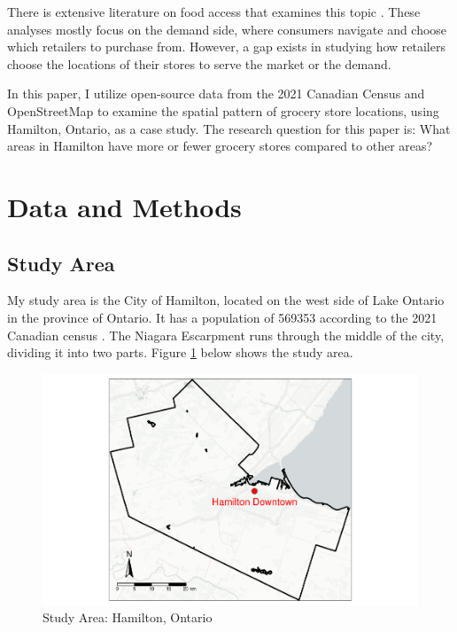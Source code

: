 \documentclass[preprint, 3p,
authoryear]{elsarticle} %
\begin{document}
There is extensive literature on food access that examines this topic
\citep{christian2012using, widener2015spatiotemporal, farber2014temporal, widener2017changes}.
These analyses mostly focus on the demand side, where consumers navigate
and choose which retailers to purchase from. However, a gap exists in
studying how retailers choose the locations of their stores to serve the
market or the demand.

In this paper, I utilize open-source data from the 2021 Canadian Census
\citep{census} and OpenStreetMap \citep{osm} to examine the spatial
pattern of grocery store locations, using Hamilton, Ontario, as a case
study. The research question for this paper is: What areas in Hamilton
have more or fewer grocery stores compared to other areas?

\section{Data and Methods}\label{data-and-methods}

\subsection{Study Area}\label{study-area}

My study area is the City of Hamilton, located on the west side of Lake
Ontario in the province of Ontario. It has a population of 569353
according to the 2021 Canadian census \citep{census}. The Niagara
Escarpment runs through the middle of the city, dividing it into two
parts. Figure \ref{fig:study_area} below shows the study area.

\begin{figure}
\centering
\includegraphics{grocery_store_hamilton_files/figure-latex/unnamed-chunk-4-1.pdf}
\caption{\label{fig:study_area}Study Area: Hamilton, Ontario}
\end{figure}
\end{document}
